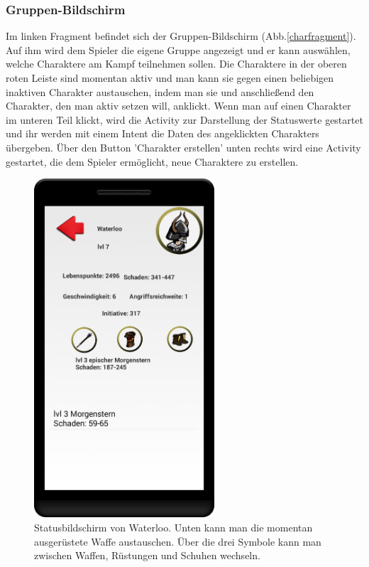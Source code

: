 \documentclass[extern,palatino]{cgBA}
\begin{document}
\subsubsection{Gruppen-Bildschirm}
Im linken Fragment befindet sich der Gruppen-Bildschirm (Abb.\ref{charfragment}). Auf ihm wird dem Spieler die eigene Gruppe angezeigt und er kann auswählen, welche Charaktere am Kampf teilnehmen sollen. Die Charaktere in der oberen roten Leiste sind momentan aktiv und man kann sie gegen einen beliebigen inaktiven Charakter austauschen, indem man sie und anschließend den Charakter, den man aktiv setzen will, anklickt.
Wenn man auf einen Charakter im unteren Teil klickt, wird die Activity zur Darstellung der Statuswerte gestartet und ihr werden mit einem Intent die Daten des angeklickten Charakters übergeben. Über den Button 'Charakter erstellen' unten rechts wird eine Activity gestartet, die dem Spieler ermöglicht, neue Charaktere zu erstellen.
\newpage
\begin{figure}[H] 
	\centering
	\includegraphics[width=0.6\textwidth]{statscreen.png}
	\caption{Statusbildschirm von Waterloo. Unten kann man die momentan ausgerüstete Waffe austauschen. Über die drei Symbole kann man zwischen Waffen, Rüstungen und Schuhen wechseln.}
	\label{statscreen}
\end{figure} 
\end{document}
